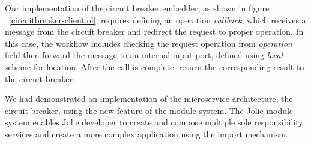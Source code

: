Our implementation of the circuit breaker embedder, as shown in figure ~\ref{circuitbreaker-client.ol}, requires defining an operation \textit{callback}, which receives a message from the circuit breaker and redirect the request to proper operation. In this case, the workflow includes checking the request operation from \textit{operation} field then forward the message to an internal input port, defined using \textit{local} scheme for location. After the call is complete, return the corresponding result to the circuit breaker.

We had demonstrated an implementation of the microservice architecture, the circuit breaker, using the new feature of the module system. The Jolie module system enables Jolie developer to create and compose multiple sole responsibility services and create a more complex application using the import mechanism.